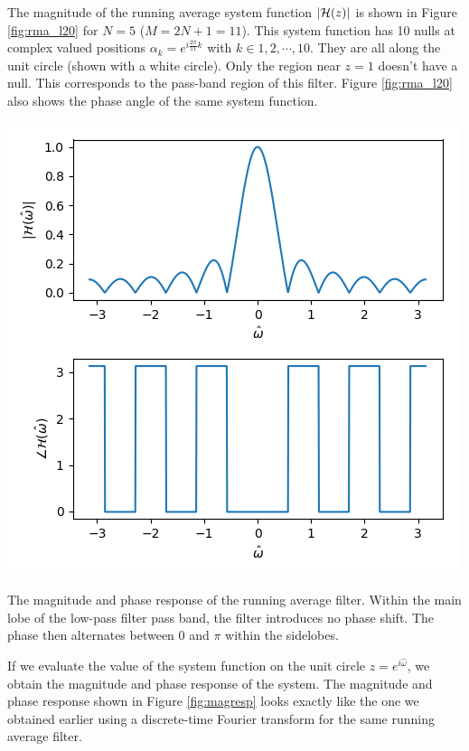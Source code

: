 The magnitude of the running average system function $|\mathcal{H}(z)|$ is shown
in Figure \ref{fig:rma_l20} for $N=5$ ($M=2N+1 = 11$). This system
function has 10 nulls at complex valued positions
$\alpha_k=e^{i\frac{2\pi}{11}k}$ with $k\in {1,2,\cdots,10}$. They are
all along the unit circle (shown with a white circle). Only the region
near $z=1$ doesn't have a null. This corresponds to the pass-band
region of this filter. Figure \ref{fig:rma_l20} also shows the phase
angle of the same system function.
\begin{marginfigure}
\begin{center}
\includegraphics[width=\textwidth]{code/025_system_function/rma_magresp.png}
\end{center}
\caption{The magnitude and phase response of the running average
  filter. Within the main lobe of the low-pass filter pass band, the
  filter introduces no phase shift. The phase then alternates between
  0 and $\pi$ within the sidelobes.}
\label{fig:magresp}
\end{marginfigure}

If we evaluate the value of the system function on the unit circle
$z=e^{i\hat{\omega}}$, we obtain the magnitude and phase response of
the system. The magnitude and phase response shown in Figure
\ref{fig:magresp} looks exactly like the one we obtained earlier using
a discrete-time Fourier transform for the same running average filter.



